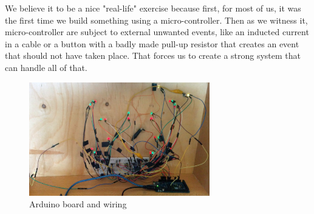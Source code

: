We believe it to be a nice "real-life" exercise because first, for most of us, it was the first time we build something using a micro-controller. Then as we witness it, micro-controller are subject to external unwanted events, like an inducted current in a cable or a button with a badly made pull-up resistor that creates an event that should not have taken place. That forces us to create a strong system that can handle all of that.


\begin{figure}[H]\label{fig:ardhazard}
  \centering
    \includegraphics[width=0.7\textwidth]{../common/images/arduinowiring.jpg}
    \caption{Arduino board and wiring}
\end{figure}